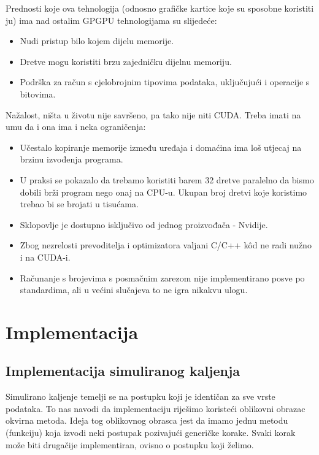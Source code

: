 \documentclass[times, utf8, zavrsni]{fer}
\begin{document}
Prednosti koje ova tehnologija (odnosno grafičke kartice koje su
sposobne koristiti ju) ima nad ostalim GPGPU tehnologijama
su slijedeće:

\begin{itemize}
\item
Nudi pristup bilo kojem dijelu memorije. 

\item
Dretve mogu koristiti brzu zajedničku dijelnu memoriju. 

\item
Podrška za račun s cjelobrojnim tipovima podataka, uključujući
i operacije s bitovima.
\end{itemize}

Nažalost, ništa u životu nije savršeno, pa tako nije niti CUDA.
Treba imati na umu da i ona ima i neka ograničenja:

\begin{itemize}
\item
Učestalo kopiranje memorije između uređaja i domaćina ima loš
utjecaj na brzinu izvođenja programa.

\item
U praksi se pokazalo da trebamo koristiti barem 32 dretve paralelno
da bismo dobili brži program nego onaj na CPU-u. Ukupan broj dretvi
koje koristimo trebao bi se brojati u tisućama. 

\item
Sklopovlje je dostupno isključivo od jednog proizvođača - Nvidije. 

\item
Zbog nezrelosti prevoditelja i optimizatora valjani C/C++ kôd
ne radi nužno i na CUDA-i. 

\item
Računanje s brojevima s posmačnim zarezom nije implementirano posve
po standardima, ali u većini slučajeva to ne igra nikakvu ulogu.
\end{itemize}







\chapter{Implementacija}
\label{chapter:Implementacija}


\section{Implementacija simuliranog kaljenja}
Simulirano kaljenje temelji se na postupku koji je identičan
za sve vrste podataka. To nas navodi da implementaciju 
riješimo koristeći oblikovni obrazac okvirna metoda. 
Ideja tog oblikovnog obrasca jest da imamo jednu
metodu (funkciju) koja izvodi neki postupak pozivajući
generičke korake. Svaki korak može biti drugačije implementiran,
ovisno o postupku koji želimo. 
\end{document}
